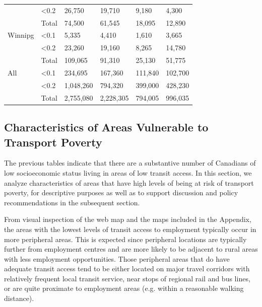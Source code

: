 \documentclass[11 pt, letterpaper]{article}
\begin{document}
{\begin{table}[H]
\begin{tabular}{ll|llll}
& \textless 0.2   & 26,750    & 19,710    & 9,180   & 4,300   \\
& Total & 74,500    & 61,545    & 18,095  & 12,890  \\ \hline
Winnipg     & \textless 0.1  & 5,335     & 4,410     & 1,610   & 3,665   \\
& \textless 0.2   & 23,260    & 19,160    & 8,265   & 14,780  \\
& Total & 109,065   & 91,310    & 25,130  & 51,775  \\ \hline
All         & \textless 0.1  & 234,695   & 167,360   & 111,840 & 102,700 \\
& \textless 0.2   & 1,048,260 & 794,320   & 399,000 & 428,230 \\
& Total & 2,755,080 & 2,228,305 & 794,005 & 996,035
	\end{tabular}
\end{table}
\newpage





\subsection{Characteristics of Areas Vulnerable to Transport Poverty}

The previous tables indicate that there are a substantive number of Canadians of low socioeconomic status living in areas of low transit access. In this section, we analyze characteristics of areas that have high levels of being at risk of transport poverty, for descriptive purposes as well as to support discussion and policy recommendations in the subsequent section. 

From visual inspection of the web map and the maps included in the Appendix, the areas with the lowest levels of transit access to employment typically occur in more peripheral areas. This is expected since peripheral locations are typically further from employment centres and are more likely to be adjacent to rural areas with less employment opportunities. Those peripheral areas that do have adequate transit access tend to be either located on major travel corridors with relatively frequent local transit service, near stops of regional rail and bus lines, or are quite proximate to employment areas (e.g. within a reasonable walking distance). 

}
\end{document}
